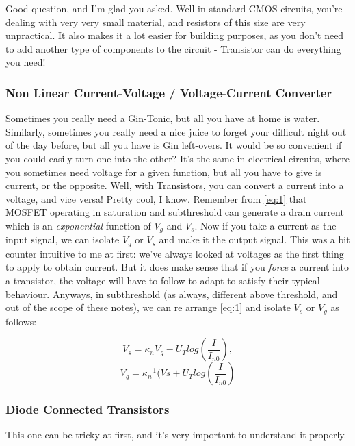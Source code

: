 Good question, and I'm glad you asked. Well in standard CMOS circuits, you're dealing with very very small material, and resistors of this size are very unpractical. It also makes it a lot easier for building purposes, as you don't need to add another type of components to the circuit - Transistor can do everything you need!


\subsubsection{Non Linear Current-Voltage / Voltage-Current Converter}

Sometimes you really need a Gin-Tonic, but all you have at home is water. Similarly, sometimes you really need a nice juice to forget your difficult night out of the day before, but all you have is Gin left-overs. It would be so convenient if you could easily turn one into the other? It's the same in electrical circuits, where you sometimes need voltage for a given function, but all you have to give is current, or the opposite. Well, with Transistors, you can convert a current into a voltage, and vice versa! Pretty cool, I know. 
Remember from \ref{eq:1} that MOSFET operating in saturation and subthreshold can generate a drain current which is an \emph{exponential} function of $V_g$ and $V_s$. Now if you take a current as the input signal, we can isolate $V_g$ or $V_s$ and make it the output signal. This was a bit counter intuitive to me at first: we've always looked at voltages as the first thing to apply to obtain current. But it does make sense that if you \emph{force} a current into a transistor, the voltage will have to follow to adapt to satisfy their typical behaviour. Anyways, in subthreshold (as always, different above threshold, and out of the scope of these notes), we can re arrange \ref{eq:1} and isolate $V_s$ or $V_g$ as follows:  

\begin{equation}
V_s = \kappa_n V_g - U_T log(\frac{I}{I_{n0}}),
\end{equation}
\begin{equation}
V_g = \kappa_n^{-1}(Vs + U_T log(\frac{I}{I_{n0}})
\end{equation}

\subsubsection{Diode Connected Transistors}

This one can be tricky at first, and it's very important to understand it properly. 

